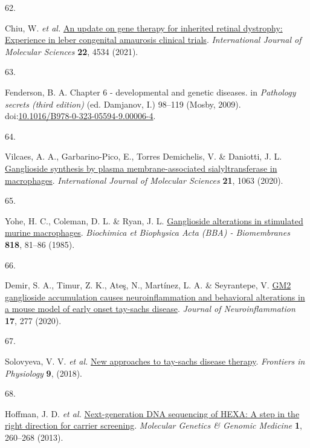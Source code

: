 \documentclass[
]{article}
\newlength{\cslhangindent}
\newlength{\csllabelwidth}
\newenvironment{CSLReferences}[2] %
 {\begin{list}{}{%
  \setlength{\itemindent}{0pt}
  \setlength{\leftmargin}{0pt}
  \setlength{\parsep}{0pt}
  \ifodd #1
   \setlength{\leftmargin}{\cslhangindent}
   \setlength{\itemindent}{-1\cslhangindent}
  \fi
  \setlength{\itemsep}{#2\baselineskip}}}
 {\end{list}}
\newcommand{\CSLLeftMargin}[1]{\parbox[t]{\csllabelwidth}{\strut#1\strut}}
\newcommand{\CSLRightInline}[1]{\parbox[t]{\linewidth - \csllabelwidth}{\strut#1\strut}}
\begin{document}
\begin{CSLReferences}{0}{0}
\CSLLeftMargin{62. }%
\CSLRightInline{Chiu, W. \emph{et al.}
\href{https://doi.org/10.3390/ijms22094534}{An update on gene therapy
for inherited retinal dystrophy: Experience in leber congenital
amaurosis clinical trials}. \emph{International Journal of Molecular
Sciences} \textbf{22}, 4534 (2021).}

\CSLLeftMargin{63. }%
\CSLRightInline{Fenderson, B. A. Chapter 6 - developmental and genetic
diseases. in \emph{Pathology secrets (third edition)} (ed. Damjanov, I.)
98--119 (Mosby, 2009).
doi:\href{https://doi.org/10.1016/B978-0-323-05594-9.00006-4}{10.1016/B978-0-323-05594-9.00006-4}.}

\CSLLeftMargin{64. }%
\CSLRightInline{Vilcaes, A. A., Garbarino-Pico, E., Torres Demichelis,
V. \& Daniotti, J. L.
\href{https://doi.org/10.3390/ijms21031063}{Ganglioside synthesis by
plasma membrane-associated sialyltransferase in macrophages}.
\emph{International Journal of Molecular Sciences} \textbf{21}, 1063
(2020).}

\CSLLeftMargin{65. }%
\CSLRightInline{Yohe, H. C., Coleman, D. L. \& Ryan, J. L.
\href{https://doi.org/10.1016/0005-2736(85)90141-5}{Ganglioside
alterations in stimulated murine macrophages}. \emph{Biochimica et
Biophysica Acta (BBA) - Biomembranes} \textbf{818}, 81--86 (1985).}

\CSLLeftMargin{66. }%
\CSLRightInline{Demir, S. A., Timur, Z. K., Ateş, N., Martínez, L. A. \&
Seyrantepe, V. \href{https://doi.org/10.1186/s12974-020-01947-6}{GM2
ganglioside accumulation causes neuroinflammation and behavioral
alterations in a mouse model of early onset tay-sachs disease}.
\emph{Journal of Neuroinflammation} \textbf{17}, 277 (2020).}

\CSLLeftMargin{67. }%
\CSLRightInline{Solovyeva, V. V. \emph{et al.}
\href{https://doi.org/10.3389/fphys.2018.01663}{New approaches to
tay-sachs disease therapy}. \emph{Frontiers in Physiology} \textbf{9},
(2018).}

\CSLLeftMargin{68. }%
\CSLRightInline{Hoffman, J. D. \emph{et al.}
\href{https://doi.org/10.1002/mgg3.37}{Next-generation DNA sequencing of
HEXA: A step in the right direction for carrier screening}.
\emph{Molecular Genetics \& Genomic Medicine} \textbf{1}, 260--268
(2013).}


\end{CSLReferences}
\end{document}
